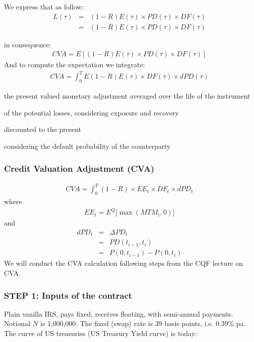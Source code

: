\documentclass[11pt]{article}
\numberwithin{equation}{subsection}
\begin{document}
\noindent We express that as follow:
\begin{eqnarray*}
L(\tau)&=&(1-R)E(\tau) \times PD(\tau) \times DF(\tau)\\
&=&(1-R)E(\tau) \times PD(\tau) \times DF(\tau)
\end{eqnarray*}
	
\noindent in consequence:
\begin{eqnarray*}
CVA = E[(1-R)E(\tau) \times PD(\tau) \times DF(\tau)]
\end{eqnarray*}
And to compute the expectation we integrate:
\begin{eqnarray*}
CVA = \int_{0}^{T} E(1-R)E(\tau) \times DF(\tau) \times dPD(\tau)
\end{eqnarray*}


the present valued monetary adjustment
averaged over the life of the instrument

of the potential losses, considering exposure and recovery

discounted to the present 

considering the default probability of the counterparty

\subsubsection{Credit Valuation Adjustment (CVA)}

\begin{eqnarray*}
CVA = \int_{0}^{T} (1-R) \times EE_{t} \times DF_{t}  \times  dPD_{t}
\end{eqnarray*}
where 
\begin{eqnarray*}
EE_{t} = E^{Q} \big[\max(MTM_{t},0)\big]
\end{eqnarray*}
and 
\begin{eqnarray*}
dPD_{t}&=&\Delta PD_{t}\\
&=&PD(t_{i-1}, t_{i})\\
&=&P(0, t_{i-1}) - P(0, t_{i})
\end{eqnarray*}
We will conduct the CVA calculation following steps from the CQF lecture on CVA.

\subsubsection{STEP 1: Inputs of the contract}
Plain vanilla IRS, pays fixed, receives floating, with semi-annual payments. Notional \(N\) is 1,000,000. 
The fixed (swap) rate is 39 basis points, i.e. 0.39\% pa. The curve of US treasuries (US Treasury Yield curve) is today:
\end{document}
